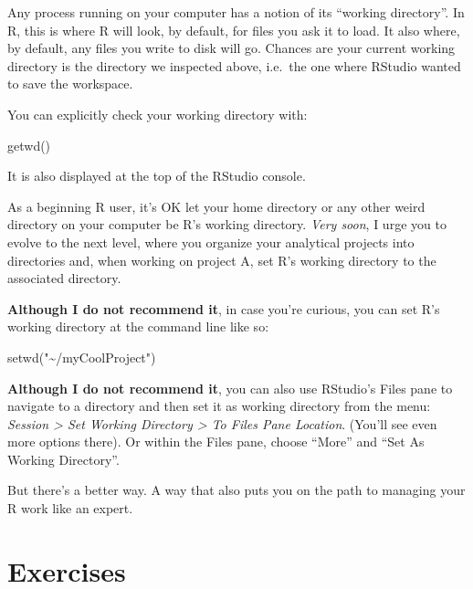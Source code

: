 \documentclass[
]{book}
\newenvironment{Shaded}{\begin{snugshade}}{\end{snugshade}}
\newcommand{\FunctionTok}[1]{\textcolor[rgb]{0.00,0.00,0.00}{#1}}
\newcommand{\NormalTok}[1]{#1}
\newcommand{\StringTok}[1]{\textcolor[rgb]{0.31,0.60,0.02}{#1}}
\begin{document}
Any process running on your computer has a notion of its ``working directory''. In R, this is where R will look, by default, for files you ask it to load. It also where, by default, any files you write to disk will go. Chances are your current working directory is the directory we inspected above, i.e.~the one where RStudio wanted to save the workspace.

You can explicitly check your working directory with:

\begin{Shaded}
\begin{Highlighting}[]
\FunctionTok{getwd}\NormalTok{()}
\end{Highlighting}
\end{Shaded}

It is also displayed at the top of the RStudio console.

As a beginning R user, it's OK let your home directory or any other weird directory on your computer be R's working directory. \emph{Very soon}, I urge you to evolve to the next level, where you organize your analytical projects into directories and, when working on project A, set R's working directory to the associated directory.

\textbf{Although I do not recommend it}, in case you're curious, you can set R's working directory at the command line like so:

\begin{Shaded}
\begin{Highlighting}[]
\FunctionTok{setwd}\NormalTok{(}\StringTok{"\textasciitilde{}/myCoolProject"}\NormalTok{)}
\end{Highlighting}
\end{Shaded}

\textbf{Although I do not recommend it}, you can also use RStudio's Files pane to navigate to a directory and then set it as working directory from the menu: \emph{Session \textgreater{} Set Working Directory \textgreater{} To Files Pane Location}. (You'll see even more options there). Or within the Files pane, choose ``More'' and ``Set As Working Directory''.

But there's a better way. A way that also puts you on the path to managing your R work like an expert.

\hypertarget{exercises}{%
\section{Exercises}\label{exercises}}
\end{document}
